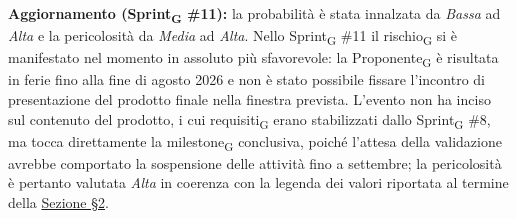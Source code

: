 ﻿\documentclass[a4paper, 10pt, colorlinks=true, linkcolor=black, urlcolor=blue, citecolor=blue, hidelinks]{article}
\begin{document}
\textbf{Aggiornamento (Sprint\textsubscript{G} \#11):} la probabilità è stata innalzata da \textit{Bassa} ad \textit{Alta} e la pericolosità da \textit{Media} ad \textit{Alta}. Nello Sprint\textsubscript{G} \#11 il rischio\textsubscript{G} si è manifestato nel momento in assoluto più sfavorevole: la Proponente\textsubscript{G} è risultata in ferie fino alla fine di agosto 2026 e non è stato possibile fissare l'incontro di presentazione del prodotto finale nella finestra prevista. L'evento non ha inciso sul contenuto del prodotto, i cui requisiti\textsubscript{G} erano stabilizzati dallo Sprint\textsubscript{G} \#8, ma tocca direttamente la milestone\textsubscript{G} conclusiva, poiché l'attesa della validazione avrebbe comportato la sospensione delle attività fino a settembre; la pericolosità è pertanto valutata \textit{Alta} in coerenza con la legenda dei valori riportata al termine della \hyperref[tab:gestione-rischi]{Sezione \S2}.
\end{document}
